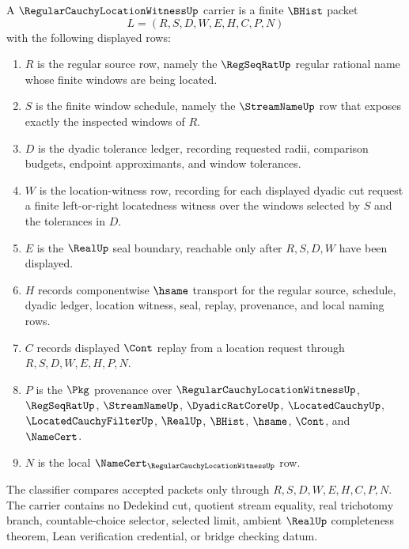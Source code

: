 \begin{definition}
\label{def:regular-cauchy-location-witness-carrier}
A $\RegularCauchyLocationWitnessUp$ carrier is a finite $\BHist$ packet
$$
L=(R,S,D,W,E,H,C,P,N)
$$
with the following displayed rows:
\begin{enumerate}
\item $R$ is the regular source row, namely the $\RegSeqRatUp$ regular rational name whose finite windows are being located.
\item $S$ is the finite window schedule, namely the $\StreamNameUp$ row that exposes exactly the inspected windows of $R$.
\item $D$ is the dyadic tolerance ledger, recording requested radii, comparison budgets, endpoint approximants, and window tolerances.
\item $W$ is the location-witness row, recording for each displayed dyadic cut request a finite left-or-right locatedness witness over the windows selected by $S$ and the tolerances in $D$.
\item $E$ is the $\RealUp$ seal boundary, reachable only after $R,S,D,W$ have been displayed.
\item $H$ records componentwise $\hsame$ transport for the regular source, schedule, dyadic ledger, location witness, seal, replay, provenance, and local naming rows.
\item $C$ records displayed $\Cont$ replay from a location request through $R,S,D,W,E,H,P,N$.
\item $P$ is the $\Pkg$ provenance over $\RegularCauchyLocationWitnessUp$, $\RegSeqRatUp$, $\StreamNameUp$, $\DyadicRatCoreUp$, $\LocatedCauchyUp$, $\LocatedCauchyFilterUp$, $\RealUp$, $\BHist$, $\hsame$, $\Cont$, and $\NameCert$.
\item $N$ is the local $\NameCert_{\RegularCauchyLocationWitnessUp}$ row.
\end{enumerate}
The classifier compares accepted packets only through $R,S,D,W,E,H,C,P,N$. The carrier contains no Dedekind cut, quotient stream equality, real trichotomy branch, countable-choice selector, selected limit, ambient $\RealUp$ completeness theorem, Lean verification credential, or bridge checking datum.
\end{definition}


